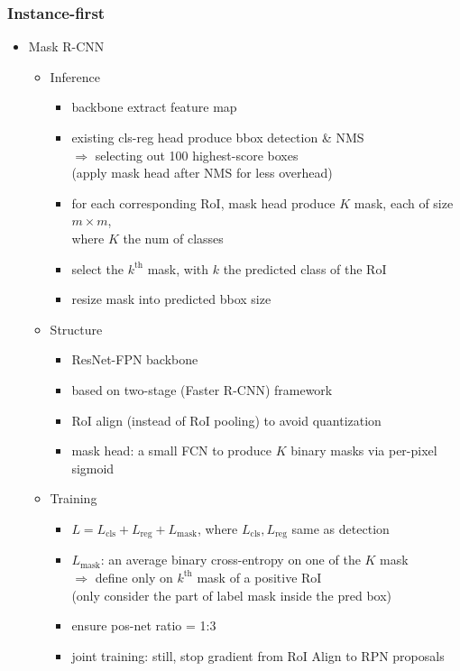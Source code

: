 \subsubsection{Instance-first}
\begin{itemize}
\item Mask R-CNN
	\begin{itemize}
	\item Inference
		\begin{itemize}
		\item backbone extract feature map
		\item existing cls-reg head produce bbox detection \& NMS \\
		$\Rightarrow$ selecting out 100 highest-score boxes \\
		(apply mask head after NMS for less overhead)
		\item for each corresponding RoI, mask head produce $K$ mask, each of size $m\times m$, \\
		where $K$ the num of classes
		\item select the $k^\text{th}$ mask, with $k$ the predicted class of the RoI
		\item resize  mask into predicted bbox size
		\end{itemize}
	\item Structure
		\begin{itemize}
		\item ResNet-FPN backbone
		\item based on two-stage (Faster R-CNN) framework
		\item RoI align (instead of RoI pooling) to avoid quantization
		\item mask head: a small FCN to produce $K$ binary masks via per-pixel sigmoid
		\end{itemize}
	\item Training
		\begin{itemize}
		\item $L=L_\text{cls}+L_\text{reg}+L_\text{mask}$, 
		where $L_\text{cls}, L_\text{reg}$ same as detection
		\item $L_\text{mask}$: an average binary cross-entropy on one of the $K$ mask \\
		$\Rightarrow$ define only on $k^\text{th}$ mask of a positive RoI \\
		(only consider the part of label mask inside the pred box)
		\item ensure pos-net ratio = 1:3
		\item joint training: still, stop gradient from RoI Align to RPN proposals

\end{itemize}
\end{itemize}
\end{itemize}
